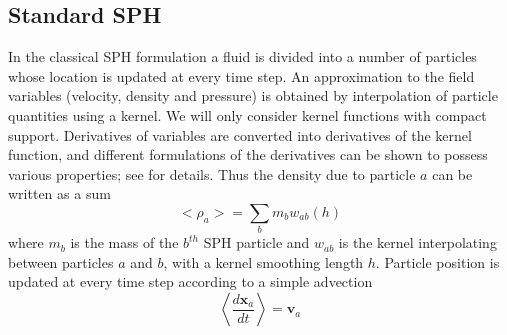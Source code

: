 \documentclass[review]{elsarticle}
\begin{document}
\subsection{Standard SPH} \label{standard-sph}
In the classical SPH formulation a fluid is divided into a number of particles whose location is updated at every time step. An approximation to the field variables (velocity, density and pressure) is obtained by interpolation of particle quantities using a kernel.
We will only consider kernel functions with compact support. Derivatives of variables are converted into derivatives of the kernel function, and different formulations of the derivatives can be shown to possess various properties; see \citep{monaghan1992smoothed,monaghan2005smoothed,liu2010smoothed, price2012smoothed} for details. Thus the density due to particle $a$ can be written as a sum
\begin{equation}
<\rho_a> = \sum_b m_b w_{ab} \left(h\right) \label{eq:ns-sph-d}
\end{equation}
where $m_b$ is the  mass of the $b^{th}$ SPH particle and $w_{ab}$ is the kernel interpolating between particles $a$ and $b$, with a kernel smoothing length $h$. Particle position is updated at every time step according to  a simple advection
\begin{equation}
\left\langle\dfrac{d \textbf{x}_a}{dt}\right\rangle = \textbf{v}_a \label{eq:SPH-update-pos}
\end{equation}
\end{document}
